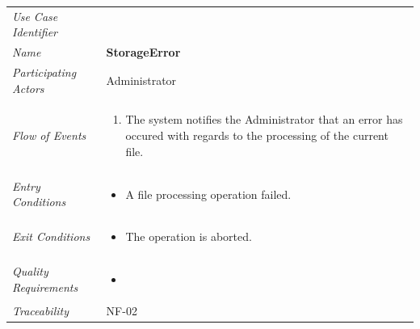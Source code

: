 \documentclass[12pt,letterpaper]{article}
\begin{document}
\begin{center}
	\begin{tabu} to 
		\toprule
		Use Case Identifier & \storageerror{} \\
		Name & {\bf StorageError} \\
		Participating Actors & Administrator \\
		Flow of Events & 
	    \begin{enumerate}[topsep=-1em,leftmargin=*]
		    \item The system notifies the Administrator that an error has occured with regards to the processing of
		    the current file.
		\end{enumerate} \\

		Entry Conditions &
		\begin{itemize}[topsep=-1em,leftmargin=*]
		    \item A file processing operation failed.
        \end{itemize} \\

		Exit Conditions &
		\begin{itemize}[topsep=-1em,leftmargin=*]
		    \item The operation is aborted.
        \end{itemize} \\

		Quality Requirements &
		\begin{itemize}[topsep=-1em,leftmargin=*]
		    \item 
        \end{itemize} \\

		Traceability & NF-02 \\
		\toprule
	\end{tabu}
\end{center}
\end{document}
